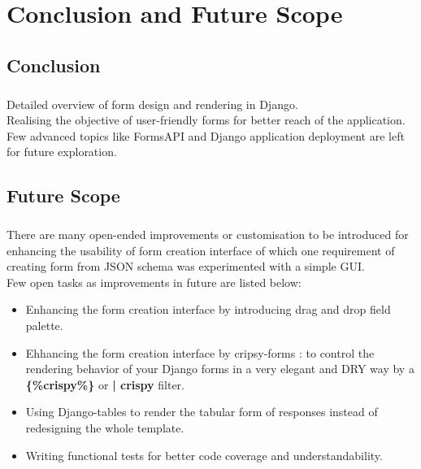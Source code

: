 	\chapter{Conclusion and Future Scope}
\section{Conclusion}
\paragraph{}Detailed overview of form design and rendering in Django.\\
Realising the objective of user-friendly forms for better reach of the application.\\
Few advanced topics like FormsAPI and Django application deployment are left for future exploration.
\section{Future Scope}
\paragraph{}There are many open-ended improvements or customisation to be introduced for enhancing the usability of form creation interface of which one requirement of creating form from JSON schema was experimented with a simple GUI.\\Few open tasks as improvements in future are listed below:
\begin{itemize}
 \item Enhancing the form creation interface by introducing drag and drop field palette.
 \item Ehhancing the form creation interface by cripsy-forms : to control the rendering behavior of your Django forms in a very elegant and DRY way by a \textbf{\{\%crispy\%\}} or \textbf{| crispy} filter.
 \item Using Django-tables to render the tabular form of responses instead of redesigning the whole template.
 \item Writing functional tests for better code coverage and understandability.
\end{itemize}